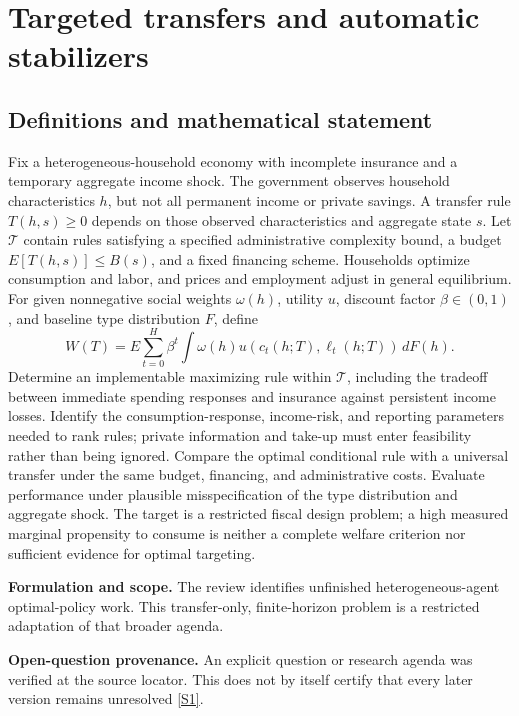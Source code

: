 \documentclass[11pt]{article}
\newcommand{\sref}[2]{\hyperlink{source:#1:#2}{[S#2]}}
\begin{document}
\section*{Targeted transfers and automatic stabilizers}\label{30007534}
\subsection{Definitions and mathematical statement}
Fix a heterogeneous-household economy with incomplete insurance and a temporary aggregate income shock. The government observes household characteristics \(h\), but not all permanent income or private savings. A transfer rule \(T(h,s)\ge0\) depends on those observed characteristics and aggregate state \(s\). Let \(\mathcal T\) contain rules satisfying a specified administrative complexity bound, a budget \(E[T(h,s)]\le B(s)\), and a fixed financing scheme. Households optimize consumption and labor, and prices and employment adjust in general equilibrium.
For given nonnegative social weights \(\omega(h)\), utility \(u\), discount factor \(\beta\in(0,1)\), and baseline type distribution \(F\), define
\[
W(T)=E\sum_{t=0}^{H}\beta^t
\int\omega(h)u(c_t(h;T),\ell_t(h;T))\,dF(h).
\]
Determine an implementable maximizing rule within \(\mathcal T\), including the tradeoff between immediate spending responses and insurance against persistent income losses. Identify the consumption-response, income-risk, and reporting parameters needed to rank rules; private information and take-up must enter feasibility rather than being ignored. Compare the optimal conditional rule with a universal transfer under the same budget, financing, and administrative costs. Evaluate performance under plausible misspecification of the type distribution and aggregate shock. The target is a restricted fiscal design problem; a high measured marginal propensity to consume is neither a complete welfare criterion nor sufficient evidence for optimal targeting.

\par\textbf{Formulation and scope.} The review identifies unfinished heterogeneous-agent optimal-policy work. This transfer-only, finite-horizon problem is a restricted adaptation of that broader agenda.

\par\textbf{Open-question provenance.} An explicit question or research agenda was verified at the source locator. This does not by itself certify that every later version remains unresolved \sref{30007534}{1}.
\end{document}
